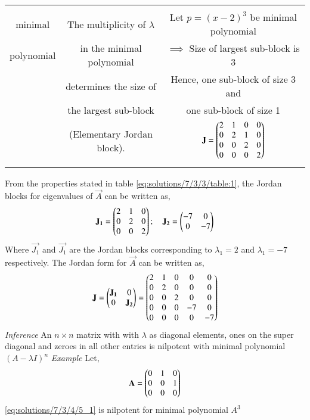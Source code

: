 \begin{table*}[!ht]
\begin{center}
\begin{tabular}{|c|c|c|}
& &\\
minimal & The multiplicity of $\lambda$ & Let $p = (x-2)^3$ be minimal polynomial\\
polynomial & in the minimal polynomial& $\implies$ Size of largest sub-block is 3\\
& determines the size of & Hence, one sub-block of size 3 and\\
& the largest sub-block & one sub-block of size 1\\
& (Elementary Jordan block).& $\mathbf{J} = \begin{pmatrix}2 & 1 & 0 & 0 \\ 0 & 2 & 1 & 0 \\ 0 & 0 & 2 & 0 \\ 0 & 0 & 0 & 2\end{pmatrix}$\\
& &\\
\hline
\end{tabular}
\caption{Properties of Jordan blocks and Jordan canonical form}
\label{eq:solutions/7/3/3/table:1}
\end{center}
\end{table*}

From the properties stated in table \ref{eq:solutions/7/3/3/table:1}, the Jordan blocks for eigenvalues of $\vec{A}$ can be written as,
\begin{align}
    \mathbf{J_1} = \begin{pmatrix}2 & 1 & 0 \\ 0 & 2 & 0 \\ 0 & 0 & 2\end{pmatrix}; \quad 
    \mathbf{J_2} = \begin{pmatrix}-7 & 0 \\ 0 & -7\end{pmatrix} \label{eq:solutions/7/3/4/eq:3_1}
\end{align}
Where $\vec{J_1}$ and $\vec{J_1}$ are the Jordan blocks corresponding to $\lambda_1 = 2$ and $\lambda_1 = -7$ respectively. The Jordan form for $\vec{A}$ can be written as,
\begin{align}
    \mathbf{J} = \begin{pmatrix}\mathbf{J_1} & 0 \\ 0 & \mathbf{J_2}\end{pmatrix} = \begin{pmatrix}2 & 1 & 0 & 0 & 0 \\ 0 & 2 & 0 & 0 & 0 \\ 0 & 0 & 2 & 0 & 0 \\ 0 & 0 & 0 & -7 & 0 \\ 0 & 0 & 0 & 0 & -7\end{pmatrix} 
\end{align}
{\em Inference}
An $n\times n$ matrix with with $\lambda$ as diagonal elements, ones on the super diagonal and zeroes in all other entries is nilpotent with minimal polynomial $(A-\lambda I)^n$
{\em Example}
Let,
\begin{align}
    \mathbf{A} = \begin{pmatrix}0 & 1 & 0 \\ 0 & 0 & 1 \\ 0 & 0 & 0\end{pmatrix} \label{eq:solutions/7/3/4/5_1}
\end{align}
\eqref{eq:solutions/7/3/4/5_1} is nilpotent for minimal polynomial $A^3$
%
